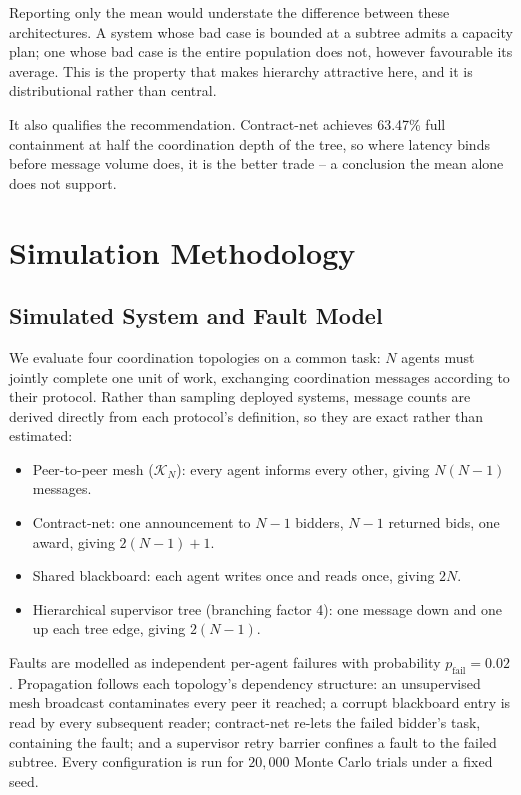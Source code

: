 \documentclass[11pt,a4paper]{article}
\begin{document}
Reporting only the mean would understate the difference between these
architectures. A system whose bad case is bounded at a subtree admits a capacity
plan; one whose bad case is the entire population does not, however favourable its
average. This is the property that makes hierarchy attractive here, and it is
distributional rather than central.

It also qualifies the recommendation. Contract-net achieves
63.47\% full containment at half the
coordination depth of the tree, so where latency binds before message volume does,
it is the better trade -- a conclusion the mean alone does not support.




\section{Simulation Methodology}



\subsection{Simulated System and Fault Model}


We evaluate four coordination topologies on a common task: $N$ agents must jointly complete one unit of work, exchanging coordination messages according to their protocol. Rather than sampling deployed systems, message counts are derived directly from each protocol's definition, so they are exact rather than estimated:

\begin{itemize}
  \item Peer-to-peer mesh ($\mathcal{K}_N$): every agent informs every other, giving $N(N-1)$ messages.
  \item Contract-net: one announcement to $N-1$ bidders, $N-1$ returned bids, one award, giving $2(N-1)+1$.
  \item Shared blackboard: each agent writes once and reads once, giving $2N$.
  \item Hierarchical supervisor tree (branching factor 4): one message down and one up each tree edge, giving $2(N-1)$.
\end{itemize}

Faults are modelled as independent per-agent failures with probability $p_{\text{fail}} = 0.02$. Propagation follows each topology's dependency structure: an unsupervised mesh broadcast contaminates every peer it reached; a corrupt blackboard entry is read by every subsequent reader; contract-net re-lets the failed bidder's task, containing the fault; and a supervisor retry barrier confines a fault to the failed subtree. Every configuration is run for $20{,}000$ Monte Carlo trials under a fixed seed.
\end{document}
